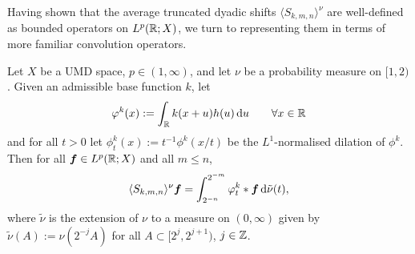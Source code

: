 Having shown that the average truncated dyadic shifts $\langle S_{k,m,n} \rangle^{\nu}$ are well-defined as bounded operators on $L^p(\mathbb{R};X)$, we turn to representing them in terms of more familiar convolution operators.

\begin{prop}\label{prop:shift-average-repn}
  Let $X$ be a UMD space, $p \in (1,\infty)$, and let $\nu$ be a probability measure on $[1,2)$.
  Given an admissible base function $k$, let
  \begin{equation}\label{eq:phik}
    \varphi^{k}(x) := \int_{\mathbb{R}} k(x+u)h(u) \, \mathrm{d} u \qquad \forall x \in \mathbb{R}
  \end{equation}
  and for all $t > 0$ let $\phi^{k}_{t}(x) := t^{-1}\phi^{k}(x/t)$ be the $L^1$-normalised dilation of $\phi^{k}$.
  Then for all $\bm{f} \in L^p(\mathbb{R};X)$ and all $m \leq n$,
  \begin{equation*}
    \langle S_{k,m,n} \rangle^{\nu} \bm{f} = \int_{2^{-n}}^{2^{-m}} \varphi_{t}^{k} \ast \bm{f} \, \mathrm{d}\tilde{\nu}(t),
  \end{equation*}
  where $\tilde{\nu}$ is the extension of $\nu$ to a measure on $(0,\infty)$ given by $\tilde{\nu}(A) := \nu(2^{-j}A)$ for all $A \subset [2^{j},2^{j+1})$, $j \in \mathbb{Z}$.
\end{prop}

